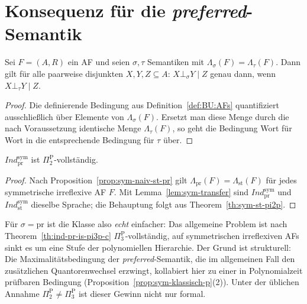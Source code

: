 \section{Konsequenz für die \textit{preferred}-Semantik}
\label{sec:sym-preferred}

\begin{Lemma}[Transferlemma]
    \label{lem:sym-transfer}
    Sei \(F=(A,R)\) ein AF und seien \(\sigma,\tau\) Semantiken mit
    \(\Lambda_\sigma(F)=\Lambda_\tau(F)\). Dann gilt für alle paarweise
    disjunkten \(X,Y,Z\subseteq A\):
    \(X\bot_\sigma Y\mid Z\) genau dann, wenn \(X\bot_\tau Y\mid Z\).
\end{Lemma}

\begin{proof}
    Die definierende Bedingung aus Definition~\ref{def:BU:AFs} quantifiziert
    ausschließlich über Elemente von \(\Lambda_\sigma(F)\). Ersetzt man diese
    Menge durch die nach Voraussetzung identische Menge \(\Lambda_\tau(F)\), so
    geht die Bedingung Wort für Wort in die entsprechende Bedingung für
    \(\tau\) über.
\end{proof}

\begin{Corollary}
    \label{cor:sym-pr-pi2p}
    \(\textit{Ind}^{\mathrm{sym}}_{\mathrm{pr}}\) ist
    \(\Pi_2^\text{P}\)-vollständig.
\end{Corollary}

\begin{proof}
    Nach Proposition~\ref{prop:sym-naiv-st-pr} gilt
    \(\Lambda_{\mathrm{pr}}(F)=\Lambda_{\mathrm{st}}(F)\) für jedes
    symmetrische irreflexive AF \(F\). Mit Lemma~\ref{lem:sym-transfer} sind
    \(\textit{Ind}^{\mathrm{sym}}_{\mathrm{pr}}\) und
    \(\textit{Ind}^{\mathrm{sym}}_{\mathrm{st}}\) dieselbe Sprache; die
    Behauptung folgt aus Theorem~\ref{th:sym-st-pi2p}.
\end{proof}

Für \(\sigma=\mathrm{pr}\) ist die Klasse also \emph{echt} einfacher: Das
allgemeine Problem ist nach Theorem~\ref{th:ind-pr-is-pi3p-c}
\(\Pi_3^\text{P}\)-vollständig, auf symmetrischen irreflexiven AFs sinkt es um
eine Stufe der polynomiellen Hierarchie. Der Grund ist strukturell: Die
Maximalitätsbedingung der \textit{preferred}-Semantik, die im allgemeinen Fall
den zusätzlichen Quantorenwechsel erzwingt, kollabiert hier zu einer in
Polynomialzeit prüfbaren Bedingung (Proposition~\ref{prop:sym-klassisch-p}(2)).
Unter der üblichen Annahme \(\Pi_2^\text{P}\neq\Pi_3^\text{P}\) ist dieser
Gewinn nicht nur formal.


